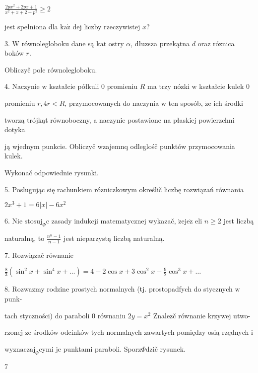 \documentclass[a4paper,12pt]{article}
\begin{document}
$\displaystyle \frac{2px^{2}+2px+1}{x^{2}+x+2-p^{2}}\geq 2$

jest spełniona dla $\mathrm{k}\mathrm{a}\dot{\mathrm{z}}$ dej liczby rzeczywistej $x$?

3. $\mathrm{W}$ równolegloboku dane są $\mathrm{k}\mathrm{a}\mathrm{t}$ ostry $\alpha$, dłuzsza przekątna $d$ oraz róznica boków $r.$

Obliczyč pole równolegloboku.

4. Naczynie $\mathrm{w}$ kształcie półkuli $0$ promieniu $R$ ma trzy nózki $\mathrm{w}$ kształcie kulek $0$

promieniu $r, 4r < R$, przymocowanych do naczynia $\mathrm{w}$ ten sposób, $\dot{\mathrm{z}}\mathrm{e}$ ich środki

tworzą trójkąt równoboczny, a naczynie postawione na płaskiej powierzchni dotyka

ją wjednym punkcie. Obliczyč wzajemnq odleglośč punktów przymocowania kulek.

Wykonač odpowiednie rysunki.

5. Poslugując się rachunkiem rózniczkowym określič liczbę rozwiązań równania

$2x^{3}+1=6|x|-6x^{2}$

6. Nie $\mathrm{s}\mathrm{t}\mathrm{o}\mathrm{s}\mathrm{u}\mathrm{j}_{\Phi}\mathrm{c}$ zasady indukcji matematycznej wykazač, $\dot{\mathrm{z}}\mathrm{e}\mathrm{j}\mathrm{e}\dot{\mathrm{z}}$ eli $n \geq 2$ jest liczbą

naturalną, to $\displaystyle \frac{n^{n}-1}{n-1}$ jest nieparzystą liczbą naturalną.

7. Rozwiązač równanie

$\displaystyle \frac{8}{3}(\sin^{2}x+\sin^{4}x+\ldots)=4-2\cos x+3\cos^{2}x-\frac{9}{2}\cos^{3}x+\ldots$

8. Rozwazmy rodzine prostych normalnych (tj. prostopadfych do stycznych $\mathrm{w}$ punk-

tach styczności) do paraboli $0$ równaniu $2y=x^{2}$ Znalez$\acute{}$č równanie krzywej utwo-

rzonej ze środków odcinków tych normalnych zawartych pomiędzy osią rzędnych $\mathrm{i}$

$\mathrm{w}\mathrm{y}\mathrm{z}\mathrm{n}\mathrm{a}\mathrm{c}\mathrm{z}\mathrm{a}\mathrm{j}_{\Phi}$cymi je punktami paraboli. Sporz$\Phi$dzič rysunek.

7
\end{document}
